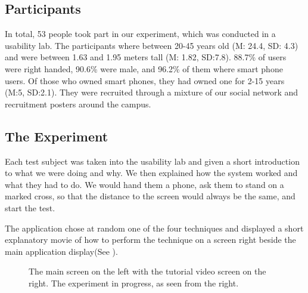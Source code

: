 \subsection{Participants}
In total, 53 people took part in our experiment, which was conducted in a usability lab. 
The participants where between 20-45 years old (M: 24.4, SD: 4.3) and were between 1.63 and 1.95 meters tall (M: 1.82, SD:7.8). 
88.7\% of users were right handed, 90.6\% were male, and 96.2\% of them where smart phone users. 
Of those who owned smart phones, they had owned one for 2-15 years (M:5, SD:2.1). 
They were recruited through a mixture of our social network and recruitment posters around the campus. 

\subsection{The Experiment}

Each test subject was taken into the usability lab and given a short introduction to what we were doing and why. 
We then explained how the system worked and what they had to do. 
We would hand them a phone, ask them to stand on a marked cross, so that the distance to the screen would always be the same, and start the test.

The application chose at random one of the four techniques and displayed a short explanatory movie of how to perform the technique on a screen right beside the main application display(See ).

\begin{figure}[H]
	\centering
	\hspace{0.01\columnwidth}
	\caption{
		\protect{} The main screen on the left with the tutorial video screen on the right.
		\protect{} The experiment in progress, as seen from the right. 
	}
	\label{fig:setup}
\end{figure} 

